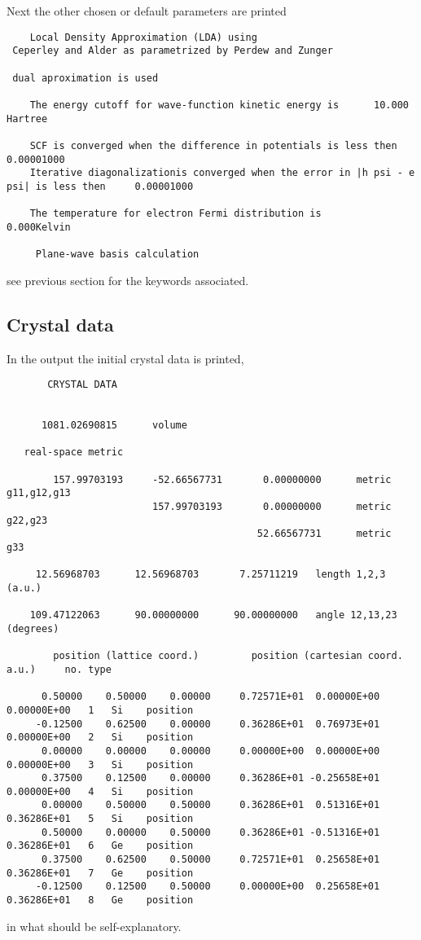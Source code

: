 \documentclass[11pt]{article}
\begin{document}
Next the other chosen or default parameters are printed
\begin{verbatim}
    Local Density Approximation (LDA) using
 Ceperley and Alder as parametrized by Perdew and Zunger

 dual aproximation is used

    The energy cutoff for wave-function kinetic energy is      10.000 Hartree

    SCF is converged when the difference in potentials is less then     0.00001000
    Iterative diagonalizationis converged when the error in |h psi - e psi| is less then     0.00001000

    The temperature for electron Fermi distribution is       0.000Kelvin

     Plane-wave basis calculation
\end{verbatim}
see previous section for the keywords associated.

\subsection{Crystal data}

In the output the initial crystal data is printed,
\begin{verbatim}
       CRYSTAL DATA


      1081.02690815      volume

   real-space metric

        157.99703193     -52.66567731       0.00000000      metric  g11,g12,g13
                         157.99703193       0.00000000      metric      g22,g23
                                           52.66567731      metric          g33

     12.56968703      12.56968703       7.25711219   length 1,2,3  (a.u.)

    109.47122063      90.00000000      90.00000000   angle 12,13,23 (degrees)

        position (lattice coord.)         position (cartesian coord. a.u.)     no. type

      0.50000    0.50000    0.00000     0.72571E+01  0.00000E+00  0.00000E+00   1   Si    position
     -0.12500    0.62500    0.00000     0.36286E+01  0.76973E+01  0.00000E+00   2   Si    position
      0.00000    0.00000    0.00000     0.00000E+00  0.00000E+00  0.00000E+00   3   Si    position
      0.37500    0.12500    0.00000     0.36286E+01 -0.25658E+01  0.00000E+00   4   Si    position
      0.00000    0.50000    0.50000     0.36286E+01  0.51316E+01  0.36286E+01   5   Si    position
      0.50000    0.00000    0.50000     0.36286E+01 -0.51316E+01  0.36286E+01   6   Ge    position
      0.37500    0.62500    0.50000     0.72571E+01  0.25658E+01  0.36286E+01   7   Ge    position
     -0.12500    0.12500    0.50000     0.00000E+00  0.25658E+01  0.36286E+01   8   Ge    position
\end{verbatim}
in what should be self-explanatory.
\end{document}
